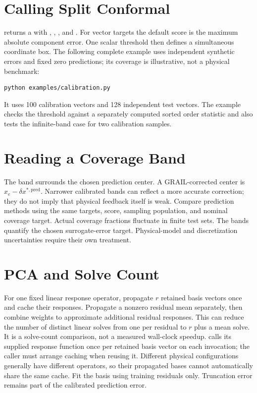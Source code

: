 \section{Calling Split Conformal}
\label{sec:calling-conformal}
returns a  with , ,
, and .
For vector targets the default score is the maximum absolute component error.
One scalar threshold then defines a simultaneous coordinate box.
The following complete example uses independent synthetic errors and fixed zero
predictions; its coverage is illustrative, not a physical benchmark:
\begin{lstlisting}[style=grailInStyle]
python examples/calibration.py
\end{lstlisting}
It uses 100 calibration vectors and 128 independent test vectors. The example
checks the threshold against a separately computed sorted order statistic and
also tests the infinite-band case for two calibration samples.

\section{Reading a Coverage Band}
\label{sec:reading-coverage}
The band surrounds the chosen prediction center. A GRAIL-corrected center is
$x_e-\delta x^{*,\mathrm{pred}}$. Narrower calibrated bands can reflect a
more accurate correction; they do not imply that physical feedback itself is
weak. Compare prediction methods using the same targets, score, sampling
population, and nominal coverage target. Actual coverage fractions fluctuate
in finite test sets.
The bands quantify the chosen surrogate-error target. Physical-model and
discretization uncertainties require their own treatment.

\section{PCA and Solve Count}
\label{sec:pca-coverage}
For one fixed linear response operator, propagate $r$ retained basis vectors
once and cache their responses. Propagate a nonzero residual mean separately,
then combine weights to approximate additional residual responses. This can
reduce the number of distinct linear solves from one per residual to $r$ plus
a mean solve. It is a solve-count comparison, not a measured wall-clock speedup.
 calls its supplied response function once per retained basis
vector on each invocation; the caller must arrange caching when reusing it.
Different physical configurations generally have different operators, so their
propagated bases cannot automatically share the same cache.
Fit the basis using training residuals only. Truncation error remains part of
the calibrated prediction error.

